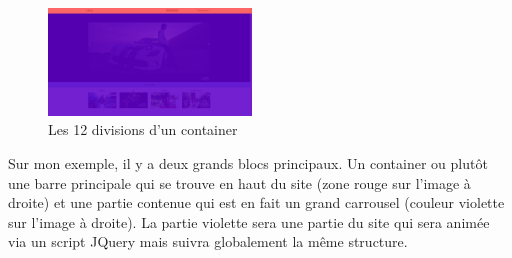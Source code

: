 \documentclass{article}
\begin{document}
\begin{figure}
  \vspace{-25pt}
  \begin{center}
    \includegraphics[width=0.48\textwidth]{p18}
  \end{center}
  \vspace{-20pt}
  \caption{Les 12 divisions d'un container}
  \vspace{-10pt}
\end{figure} 

Sur mon exemple, il y a deux grands blocs principaux. Un container ou plut\^ot une barre principale qui se trouve en haut du site (zone rouge sur l'image \`a droite) et une partie contenue qui est en fait un grand carrousel (couleur violette sur l'image \`a droite). La partie violette sera une partie du site qui sera anim\'ee via un script JQuery mais suivra globalement la m\^eme structure.\\
\end{document}
